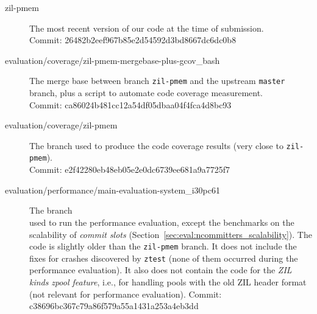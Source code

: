 \documentclass[12pt,a4paper,twoside]{book}
\begin{document}
{%
%

\begin{description}
    \item[zil-pmem]                                                                         The most recent version of our code at the time of submission.\\
                                                                                            {Commit: \footnotesize 26482b2eef967b85e2d54592d3bd8667dc6dc0b8}

    \item[evaluation/coverage/zil-pmem-mergebase-plus-gcov\_bash]                           The merge base between branch \lstinline{zil-pmem} and the upstream \lstinline{master} branch, plus a script to automate code coverage measurement.\\
                                                                                                {Commit: \footnotesize ca86024b481cc12a54df05dbaa04f4fca4d8bc93}

    \item[evaluation/coverage/zil-pmem]                                                     The branch used to produce the code coverage results (very close to \lstinline{zil-pmem}).\\
                                                                                            {Commit: \footnotesize e2f42280eb48eb05e2e0dc6739ee681a9a7725f7}

    \item[evaluation/performance/main-evaluation-system\_i30pc61]                           The branch \\ used to run the performance evaluation, except the benchmarks on the scalability of \textit{commit slots} (Section~\ref{sec:eval:ncommitters_scalability}).
                                                                                            The code is slightly older than the \lstinline{zil-pmem} branch.
                                                                                            It does not include the fixes for crashes discovered by \lstinline{ztest} (none of them occurred during the performance evaluation).
                                                                                            It also does not contain the code for the \textit{ZIL kinds} \textit{zpool feature}, i.e., for handling pools with the old ZIL header format (not relevant for performance evaluation).
                                                                                            {Commit: \footnotesize c38696bc367c79a86f579a55a1431a253a4eb3dd}


\end{description}}
\end{document}
